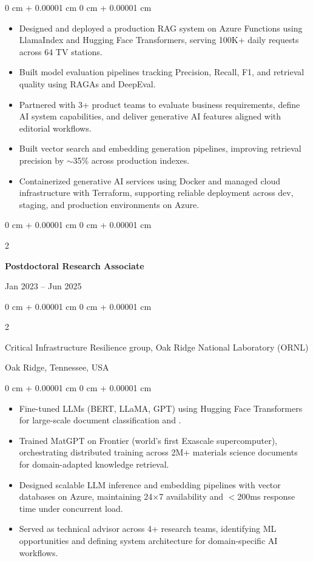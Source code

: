 \documentclass[10pt, letterpaper]{article}
\newenvironment{highlights}{
    \begin{itemize}[
        topsep=0.10 cm,
        parsep=0.10 cm,
        partopsep=0pt,
        itemsep=0pt,
        leftmargin=0 cm + 10pt
    ]
}{
    \end{itemize}
} %
\newenvironment{onecolentry}{
    \begin{adjustwidth}{
        0 cm + 0.00001 cm
    }{
        0 cm + 0.00001 cm
    }
}{
    \end{adjustwidth}
} %
\newenvironment{twocolentry}[2][]{
    \onecolentry
    \def\secondColumn{#2}
    \setcolumnwidth{\fill, 4.5 cm}
    \begin{paracol}{2}
}{
    \switchcolumn \raggedleft \secondColumn
    \end{paracol}
    \endonecolentry
} %
\begin{document}
    \begin{onecolentry}
        \begin{highlights}
            \item Designed and deployed a production RAG system on Azure Functions using LlamaIndex and Hugging Face Transformers, serving 100K+ daily requests across 64 TV stations.
            \item Built model evaluation pipelines tracking Precision, Recall, F1, and retrieval quality using RAGAs and DeepEval.
            \item Partnered with 3+ product teams to evaluate business requirements, define AI system capabilities, and deliver generative AI features aligned with editorial workflows.
            \item Built vector search and embedding generation pipelines, improving retrieval precision by $\sim$35\% across production indexes.
            \item Containerized generative AI services using Docker and managed cloud infrastructure with Terraform, supporting reliable deployment across dev, staging, and production environments on Azure.
        \end{highlights}
    \end{onecolentry}

\vspace{1mm}

    \begin{twocolentry}{Jan 2023 -- Jun 2025}
        \textbf{Postdoctoral Research Associate}
    \end{twocolentry}
    \begin{twocolentry}{Oak Ridge, Tennessee, USA}
        Critical Infrastructure Resilience group, Oak Ridge National Laboratory (ORNL)
    \end{twocolentry}
    \vspace{0.10 cm}
    \begin{onecolentry}
        \begin{highlights}
            \item Fine-tuned LLMs (BERT, LLaMA, GPT) using Hugging Face Transformers for large-scale document classification and .
            \item Trained MatGPT on Frontier (world's first Exascale supercomputer), orchestrating distributed training across 2M+ materials science documents for domain-adapted knowledge retrieval.
            \item Designed scalable LLM inference and embedding pipelines with vector databases on Azure, maintaining 24×7 availability and $<$200ms response time under concurrent load.
            \item Served as technical advisor across 4+ research teams, identifying ML opportunities and defining system architecture for domain-specific AI workflows.
        \end{highlights}
    \end{onecolentry}
\end{document}
